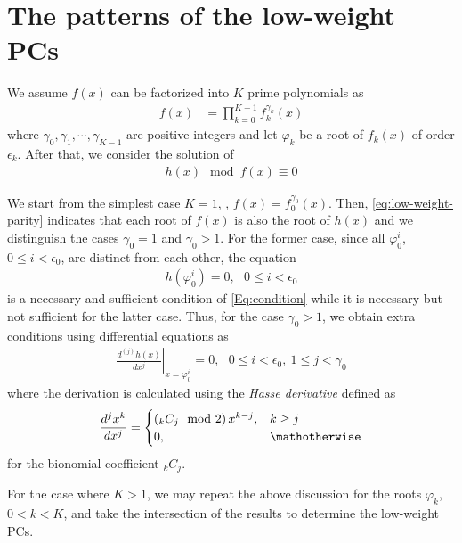 \section{The patterns of the low-weight PCs}
\label{sec3}
We assume $f(x)$ can be factorized into $K$ prime polynomials as 
\begin{align}
f(x)&=\prod_{k=0}^{K-1}f_k^{\gamma_k}(x)
\label{Eq:GeneralForm}
\end{align}
where $\gamma_0,\gamma_1,\cdots,\gamma_{K-1}$ are positive integers and let $\varphi_k$ be a root of $f_{k}(x)$ of order $\epsilon_k$. After that, we consider the solution of
\begin{align}
	h(x) \mod f(x) \equiv 0
	\label{Eq:condition}
\end{align}

We start from the simplest case $K=1$, \ie, $f(x) = f_0^{\gamma_0}(x)$. Then, \eqref{eq:low-weight-parity} indicates that each root of $f(x)$ is also the root of $h(x)$ and we distinguish the cases $\gamma_0 = 1$ and $\gamma_0 > 1$. For the former case, since all $\varphi_0^i$, $0 \leq i < \epsilon_0$, are distinct from each other, the equation
\begin{align}
	h(\varphi_0^i)=0,~~~ 0 \leq i < \epsilon_0
	\label{Eq:rootcondition}
\end{align}
is a necessary and sufficient condition of \eqref{Eq:condition} while it is necessary but not sufficient for the latter case. Thus, for the case $\gamma_0 >1$, we obtain extra conditions using differential equations as
\begin{align}
\left.\frac{d^{(j)}h(x)}{d x^j}\right|_{x=\varphi_0^i}=0,~~~0 \leq i < \epsilon_0,~1 \leq j < \gamma_0
\label{Eq:differential}
\end{align}
where the derivation is calculated using the {\it Hasse derivative} defined as
\begin{align}
\frac{d^{j}x^k}{dx^j}=
	\begin{cases}
	\left({}_kC_j\mod 2\right)x^{k-j}, & k \geq j\cr
	0, & \mathotherwise
	\end{cases}
\end{align}
for the bionomial coefficient ${}_kC_j$.

For the case where $K>1$, we may repeat the above discussion for the roots $\varphi_k$, $0 < k < K$, and take the intersection of the results to determine the low-weight PCs.

